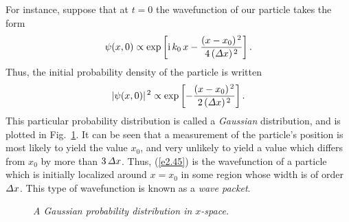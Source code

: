 For instance, suppose that at $t=0$ the wavefunction of our particle takes the
form
\begin{equation}\label{e2.45}
\psi(x,0) \propto \exp\left[{\rm i}\,k_0\,x - \frac{(x-x_0)^{\,2}}{4\,({\mit\Delta}x)^{\,2}}\right].
\end{equation}
Thus, the initial probability density of the particle is written
\begin{equation}\label{e2.46}
|\psi(x,0)|^{\,2} \propto \exp\left[- \frac{(x-x_0)^{\,2}}{2\,({\mit\Delta}x)^{\,2}}\right].
\end{equation}
This particular probability distribution is called a {\em Gaussian}\/ distribution, and is plotted in Fig.~\ref{f4}. 
It can be seen that a measurement of the particle's position is most
likely to yield the value $x_0$, and  very
unlikely to yield a value which differs from $x_0$ by more than
$3\,{\mit\Delta} x$. Thus, (\ref{e2.45}) is the wavefunction of a particle
which is initially localized around $x=x_0$ in some region whose width is
of order ${\mit\Delta} x$. This type of wavefunction is
known as a {\em wave packet}.

\begin{figure}
\centerline{}
\caption{\em A Gaussian probability distribution in $x$-space.}\label{f4}   
\end{figure}


